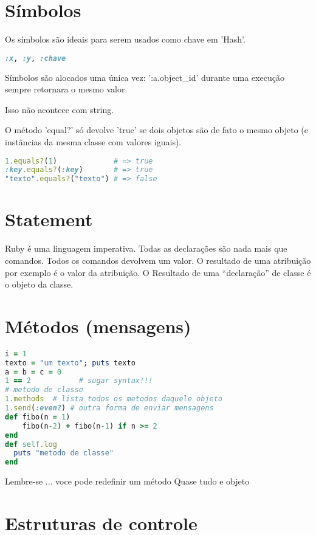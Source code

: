 \documentclass[serif,mathserif]{book}
\begin{document}
\section{Símbolos}

Os símbolos são ideais para serem usados como chave em 'Hash'.

\begin{lstlisting}[language=ruby]
:x, :y, :chave
\end{lstlisting}

Símbolos são alocados uma única vez: ':a.object\_id' durante uma execução sempre retornara o mesmo valor.

Isso não acontece com string.

O método 'equal?' só devolve 'true' se dois objetos são de fato o mesmo objeto (e instâncias da mesma classe com valores iguais).

\begin{lstlisting}[language=ruby]
1.equals?(1)             # => true
:key.equals?(:key)       # => true
"texto".equals?("texto") # => false
\end{lstlisting}

\section{Statement}
Ruby é uma linguagem imperativa. Todas as declarações são nada mais que comandos. Todos os comandos devolvem um
valor. O resultado de uma atribuição por exemplo é o valor da atribuição. O Resultado de uma ``declaração'' de classe
é o objeto da classe. 

\section{Métodos (mensagens)}
\begin{lstlisting}[language=ruby]
i = 1        
texto = "um texto"; puts texto
a = b = c = 0
1 == 2           # sugar syntax!!!
# metodo de classe
1.methods  # lista todos os metodos daquele objeto
1.send(:even?) # outra forma de enviar mensagens
def fibo(n = 1)
    fibo(n-2) + fibo(n-1) if n >= 2
end
def self.log
  puts "metodo de classe"
end
\end{lstlisting}

Lembre-se ... voce pode redefinir um método
Quase tudo e objeto



\section{Estruturas de controle}
\end{document}

